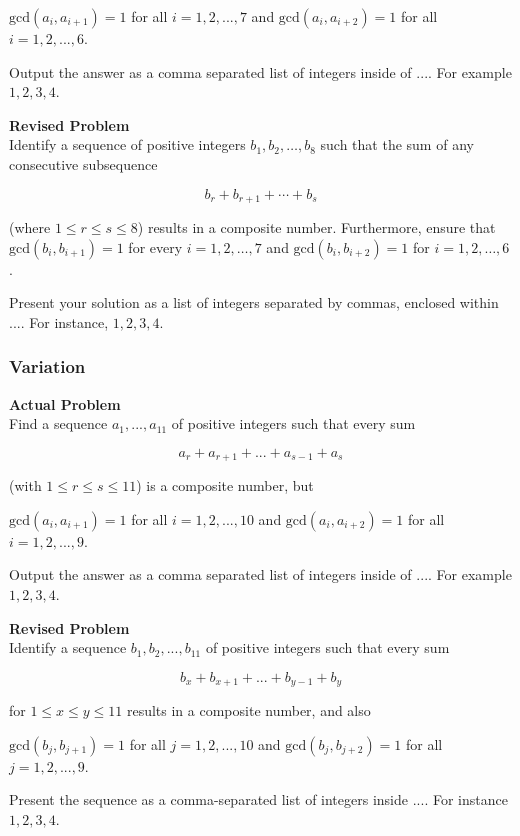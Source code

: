 $\text{gcd}(a_i, a_{i+1}) = 1$ for all $i = 1,2,...,7$ and $\text{gcd}(a_i, a_{i+2}) = 1$ for all $i = 1,2,...,6$.

Output the answer as a comma separated list of integers inside of $\boxed{...}$. For example $\boxed{1,2,3,4}$.

\textbf{Revised Problem}\\
Identify a sequence of positive integers $b_1, b_2, \ldots, b_8$ such that the sum of any consecutive subsequence 

$$b_r + b_{r+1} + \cdots + b_s$$ 

(where $1 \leq r \leq s \leq 8$) results in a composite number. Furthermore, ensure that $\text{gcd}(b_i, b_{i+1}) = 1$ for every $i = 1, 2, \ldots, 7$ and $\text{gcd}(b_i, b_{i+2}) = 1$ for $i = 1, 2, \ldots, 6$.

Present your solution as a list of integers separated by commas, enclosed within $\boxed{...}$. For instance, $\boxed{1,2,3,4}$.

\subsubsection{Variation}
\textbf{Actual Problem}\\
Find a sequence $a_1, ..., a_{11}$ of positive integers such that every sum

$$a_r + a_{r+1} + ... + a_{s-1} + a_s$$

(with $1 \leqslant r \leqslant s \leqslant 11$) is a composite number, but

$\text{gcd}(a_i, a_{i+1}) = 1$ for all $i = 1,2,...,10$ and $\text{gcd}(a_i, a_{i+2}) = 1$ for all $i = 1,2,...,9$.

Output the answer as a comma separated list of integers inside of $\boxed{...}$. For example $\boxed{1,2,3,4}$.

\textbf{Revised Problem}\\
Identify a sequence $b_1, b_2, ..., b_{11}$ of positive integers such that every sum

$$b_x + b_{x+1} + ... + b_{y-1} + b_y$$

for $1 \leq x \leq y \leq 11$ results in a composite number, and also

$\text{gcd}(b_j, b_{j+1}) = 1$ for all $j = 1,2,...,10$ and $\text{gcd}(b_j, b_{j+2}) = 1$ for all $j = 1,2,...,9$.

Present the sequence as a comma-separated list of integers inside $\boxed{...}$. For instance $\boxed{1,2,3,4}$.

